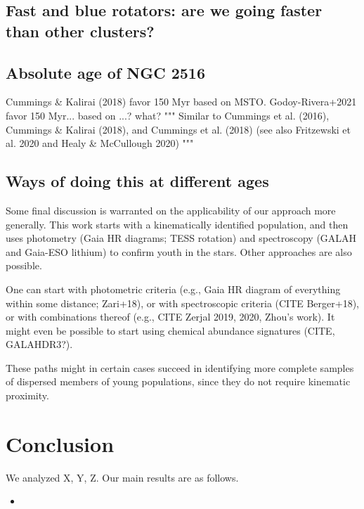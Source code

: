 \documentclass[12pt,twocolumn,tighten]{aastex63}
\begin{document}
\subsection{Fast and blue rotators: are we going faster than other clusters?}

\subsection{Absolute age of NGC 2516}
Cummings \& Kalirai (2018) favor 150 Myr based on MSTO.
Godoy-Rivera+2021 favor 150 Myr... based on ...? what?
"""
Similar to Cummings et al. (2016), Cummings \& Kalirai (2018),
and Cummings et al. (2018) (see also Fritzewski et al. 2020 and Healy
\&
McCullough 2020)
"""

\subsection{Ways of doing this at different ages}
Some final discussion is warranted on the applicability of our
approach more generally.  This work starts with a kinematically
identified population, and then uses photometry (Gaia HR diagrams;
TESS rotation) and spectroscopy (GALAH and Gaia-ESO lithium) to
confirm youth in the stars.  Other approaches are also possible.

One can start with photometric criteria (e.g., Gaia HR diagram of
everything within some distance; Zari+18), or with spectroscopic
criteria (CITE Berger+18), or with combinations thereof (e.g., CITE
Zerjal 2019, 2020, Zhou's work).  
It might even be possible to start using chemical abundance signatures
(CITE, GALAHDR3?).

These paths might in certain cases succeed in identifying more
complete samples of dispersed members of young populations, since they
do not require kinematic proximity.




\section{Conclusion}
\label{sec:conclusion}

We analyzed X, Y, Z.
Our main results are as follows.
\begin{itemize}
	\item 
\end{itemize}


\end{document}
